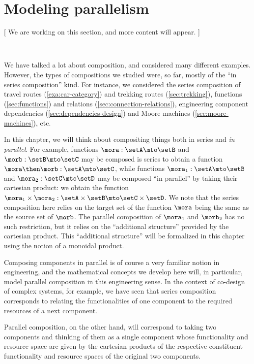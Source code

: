 

\section{Modeling parallelism}
\label{sec:modeling-parallelism}


[ We are working on this section, and more content will appear. ]

\

We have talked a lot about composition, and considered many different examples. However, the types of compositions we studied were, so far, mostly of the ``in series composition'' kind. For instance, we considered the series composition of travel routes (\cref{exa:car-category}) and trekking routes (\cref{sec:trekking}), functions (\cref{sec:functions}) and relations (\cref{sec:connection-relations}), engineering component dependencies (\cref{sec:dependencies-design}) and Moore machines (\cref{sec:moore-machines}), etc. 


In this chapter, we will think about compositing things both in series and \emph{in parallel}. For example, functions $\mora: \setA \mto \setB$ and $\morb: \setB \mto \setC$ may be composed is series to obtain a function $\mora \then \morb: \setA \mto \setC$, while functions $\mora_1 : \setA \mto \setB$ and $\mora_2 : \setC \mto \setD$ may be composed ``in parallel'' by taking their cartesian product: we obtain the function $\mora_1 \times \mora_2: \setA \times \setB \mto \setC \times \setD$. We note that the series composition here relies on the target set of the function $\mora$ being the same as the source set of $\morb$. The parallel composition of $\mora_1$ and $\morb_2$ has no such restriction, but it relies on the ``additional structure'' provided by the cartesian product. This ``additional structure'' will be formalized in this chapter using the notion of a monoidal product. 

Composing components in parallel is of course a very familiar notion in engineering, and the mathematical concepts we develop here will, in particular, model parallel composition in this engineering sense. In the context of co-design of complex systems, for example, we have seen that series composition corresponds to relating the functionalities of one component to the required resources of a next component. 


Parallel composition, on the other hand, will correspond to taking two components and thinking of them as a single component whose functionality and resource space are given by the cartesian products of the respective constituent functionality and resource spaces of the original two components. 



